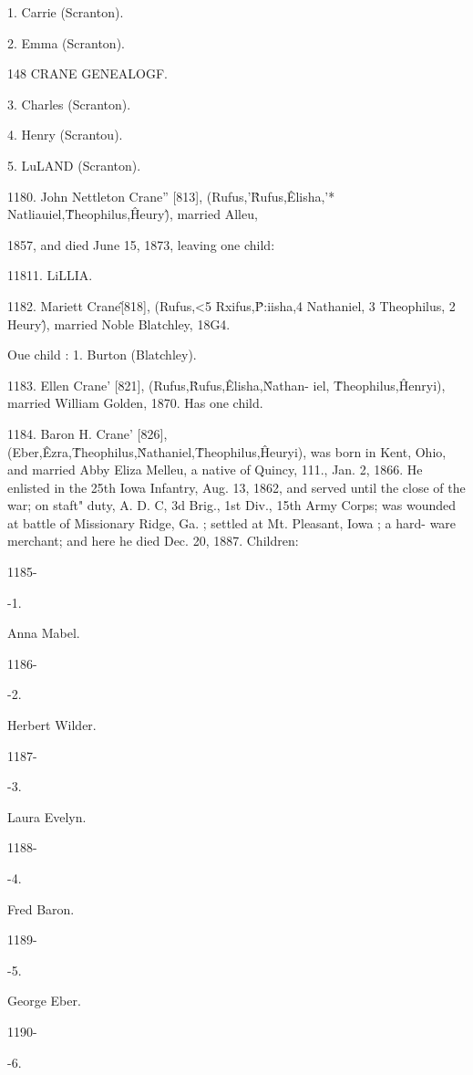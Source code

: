1. Carrie (Scranton). 

2. Emma (Scranton). 



148 CRANE GENEALOGF. 

3. Charles (Scranton). 

4. Henry (Scrantou). 

5. LuLAND (Scranton). 

1180. John Nettleton Crane'' [813], (Rufus,'\^ Rufus,\^ 

Elisha,'* Natliauiel,\^ Theophilus,\^ Heury\^), married Alleu, 

1857, and died June 15, 1873, leaving one child: 

11811. LiLLIA. 

1182. Mariett Crane\^ [818], (Rufus,<5 Rxifus,\^ P:iisha,4 
Nathaniel, 3 Theophilus, 2 Heury\^), married Noble Blatchley, 18G4. 

Oue child : 
1. Burton (Blatchley). 

1183. Ellen Crane' [821], (Rufus,\^ Rufus,\^ Elisha,\^ Nathan- 
iel, \^ Theophilus,\^ Henryi), married William Golden, 1870. Has 
one child. 

1184. Baron H. Crane' [826], (Eber,\^ Ezra,\^ Theophilus,\^ 
Nathaniel,\^ Theophilus,\^ Heuryi), was born in Kent, Ohio, and 
married Abby Eliza Melleu, a native of Quincy, 111., Jan. 2, 
1866. He enlisted in the 25th Iowa Infantry, Aug. 13, 1862, 
and served until the close of the war; on staft" duty, A. D. C, 
3d Brig., 1st Div., 15th Army Corps; was wounded at battle of 
Missionary Ridge, Ga. ; settled at Mt. Pleasant, Iowa ; a hard- 
ware merchant; and here he died Dec. 20, 1887. Children: 



1185- 


-1. 


Anna Mabel. 


1186- 


-2. 


Herbert Wilder. 


1187- 


-3. 


Laura Evelyn. 


1188- 


-4. 


Fred Baron. 


1189- 


-5. 


George Eber. 


1190- 


-6. 


